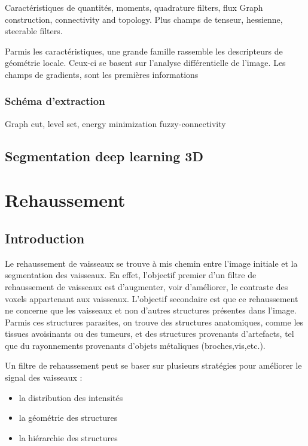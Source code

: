 {Caractéristiques de quantités, moments, quadrature filters, flux
Graph construction, connectivity and topology. 
Plus champs de tenseur, hessienne, steerable filters.

Parmis les caractéristiques, une grande famille rassemble les descripteurs de géométrie locale. Ceux-ci se basent sur l'analyse différentielle de l'image. Les champs de gradients, sont les premières informations

\subsubsection{Schéma d'extraction}

Graph cut, level set, energy minimization
fuzzy-connectivity

\subsection{Segmentation deep learning 3D}
\label{sec:EA:segmentation_deep3D}

\section{Rehaussement}
\label{sec:EA:rehaussement}
\subsection{Introduction}
\label{sec:EA:rehaussement:introduction}
Le rehaussement de vaisseaux se trouve à mis chemin entre l'image initiale et la segmentation des vaisseaux. En effet, l'objectif premier d'un filtre de rehaussement de vaisseaux est d'augmenter, voir d'améliorer, le contraste des voxels appartenant aux vaisseaux. L'objectif secondaire est que ce rehaussement ne concerne que les vaisseaux et non d'autres structures présentes dans l'image. Parmis ces structures parasites, on trouve des structures anatomiques, comme les tissues avoisinants ou des tumeurs, et des structures provenants d'artefacts, tel que du rayonnements provenants d'objets métaliques (broches,vis,etc.).

Un filtre de rehaussement peut se baser sur plusieurs stratégies pour améliorer le signal des vaisseaux :

\begin{itemize}
\item la distribution des intensités
\item la géométrie des structures
\item la hiérarchie des structures
\end{itemize}

}
